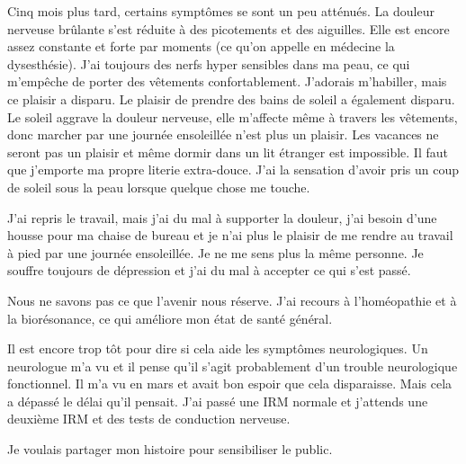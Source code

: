 Cinq mois plus tard, certains symptômes se sont un peu atténués. La douleur
nerveuse brûlante s'est réduite à des picotements et des aiguilles. Elle est
encore assez constante et forte par moments (ce qu'on appelle en médecine la
dysesthésie). J'ai toujours des nerfs hyper sensibles dans ma peau, ce qui
m'empêche de porter des vêtements confortablement. J'adorais m'habiller, mais ce
plaisir a disparu. Le plaisir de prendre des bains de soleil a également
disparu. Le soleil aggrave la douleur nerveuse, elle m'affecte même à travers
les vêtements, donc marcher par une journée ensoleillée n'est plus un
plaisir. Les vacances ne seront pas un plaisir et même dormir dans un lit
étranger est impossible. Il faut que j'emporte ma propre literie
extra-douce. J'ai la sensation d'avoir pris un coup de soleil sous la peau
lorsque quelque chose me touche.

J'ai repris le travail, mais j'ai du mal à supporter la douleur, j'ai besoin
d'une housse pour ma chaise de bureau et je n'ai plus le plaisir de me rendre au
travail à pied par une journée ensoleillée. Je ne me sens plus la même
personne. Je souffre toujours de dépression et j'ai du mal à accepter ce qui
s'est passé.

Nous ne savons pas ce que l'avenir nous réserve. J'ai recours à l'homéopathie et
à la biorésonance, ce qui améliore mon état de santé général.

Il est encore trop tôt pour dire si cela aide les symptômes neurologiques. Un
neurologue m'a vu et il pense qu'il s'agit probablement d'un trouble
neurologique fonctionnel. Il m'a vu en mars et avait bon espoir que cela
disparaisse. Mais cela a dépassé le délai qu'il pensait. J'ai passé une IRM
normale et j'attends une deuxième IRM et des tests de conduction nerveuse.

Je voulais partager mon histoire pour sensibiliser le public.

